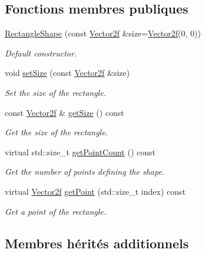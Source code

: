 \subsection*{Fonctions membres publiques}
\begin{DoxyCompactItemize}
\item 
\hyperlink{classsf_1_1RectangleShape_a83a2be157ebee85c95ed491c3e78dd7c}{Rectangle\+Shape} (const \hyperlink{classsf_1_1Vector2}{Vector2f} \&size=\hyperlink{classsf_1_1Vector2}{Vector2f}(0, 0))
\begin{DoxyCompactList}\small\item\em Default constructor. \end{DoxyCompactList}\item 
void \hyperlink{classsf_1_1RectangleShape_a5c65d374d4a259dfdc24efdd24a5dbec}{set\+Size} (const \hyperlink{classsf_1_1Vector2}{Vector2f} \&size)
\begin{DoxyCompactList}\small\item\em Set the size of the rectangle. \end{DoxyCompactList}\item 
const \hyperlink{classsf_1_1Vector2}{Vector2f} \& \hyperlink{classsf_1_1RectangleShape_ae54a07ff5537bf76de6748f592b34896}{get\+Size} () const
\begin{DoxyCompactList}\small\item\em Get the size of the rectangle. \end{DoxyCompactList}\item 
virtual std\+::size\+\_\+t \hyperlink{classsf_1_1RectangleShape_adfb2f429e5720c9ccdb26d5996c3ae33}{get\+Point\+Count} () const
\begin{DoxyCompactList}\small\item\em Get the number of points defining the shape. \end{DoxyCompactList}\item 
virtual \hyperlink{classsf_1_1Vector2}{Vector2f} \hyperlink{classsf_1_1RectangleShape_a3909f1a1946930ff5ae17c26206c0f81}{get\+Point} (std\+::size\+\_\+t index) const
\begin{DoxyCompactList}\small\item\em Get a point of the rectangle. \end{DoxyCompactList}\end{DoxyCompactItemize}
\subsection*{Membres hérités additionnels}


